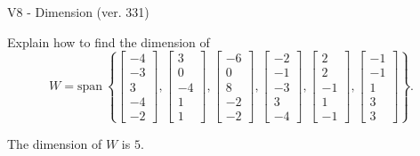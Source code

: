 \begin{exercise}
  \begin{exerciseTitle}V8 - Dimension (ver. 331)\end{exerciseTitle}
  \begin{exerciseStatement}
    Explain how to find the dimension of 
\[W=\mathrm{span}\ \left\{\left[\begin{array}{r}
-4 \\
-3 \\
3 \\
-4 \\
-2
\end{array}\right] , \left[\begin{array}{r}
3 \\
0 \\
-4 \\
1 \\
1
\end{array}\right] , \left[\begin{array}{r}
-6 \\
0 \\
8 \\
-2 \\
-2
\end{array}\right] , \left[\begin{array}{r}
-2 \\
-1 \\
-3 \\
3 \\
-4
\end{array}\right] , \left[\begin{array}{r}
2 \\
2 \\
-1 \\
1 \\
-1
\end{array}\right] , \left[\begin{array}{r}
-1 \\
-1 \\
1 \\
3 \\
3
\end{array}\right]\right\}.\]



  \end{exerciseStatement}
  \begin{exerciseAnswer}
   The dimension of \(W\) is  \(5\).
  


  \end{exerciseAnswer}
\end{exercise}